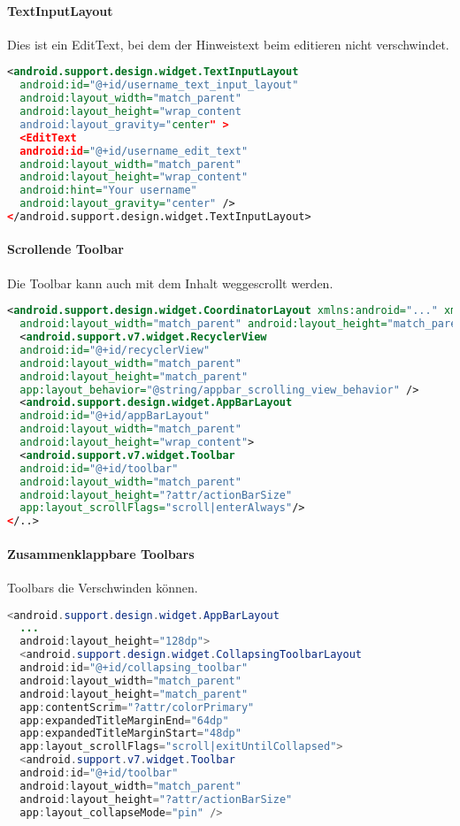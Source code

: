 \paragraph{TextInputLayout} Dies ist ein EditText, bei dem der Hinweistext beim editieren nicht verschwindet.
\begin{lstlisting}[language=xml]
<android.support.design.widget.TextInputLayout
  android:id="@+id/username_text_input_layout"
  android:layout_width="match_parent"
  android:layout_height="wrap_content
  android:layout_gravity="center" >
  <EditText
  android:id="@+id/username_edit_text"
  android:layout_width="match_parent"
  android:layout_height="wrap_content"
  android:hint="Your username"
  android:layout_gravity="center" />
</android.support.design.widget.TextInputLayout>
\end{lstlisting}
\paragraph{Scrollende Toolbar} Die Toolbar kann auch mit dem Inhalt weggescrollt werden. 
\begin{lstlisting}[language=xml]
<android.support.design.widget.CoordinatorLayout xmlns:android="..." xmlns:app="..."
  android:layout_width="match_parent" android:layout_height="match_parent">
  <android.support.v7.widget.RecyclerView
  android:id="@+id/recyclerView"
  android:layout_width="match_parent"
  android:layout_height="match_parent"
  app:layout_behavior="@string/appbar_scrolling_view_behavior" />
  <android.support.design.widget.AppBarLayout
  android:id="@+id/appBarLayout"
  android:layout_width="match_parent"
  android:layout_height="wrap_content">
  <android.support.v7.widget.Toolbar
  android:id="@+id/toolbar"
  android:layout_width="match_parent"
  android:layout_height="?attr/actionBarSize"
  app:layout_scrollFlags="scroll|enterAlways"/>
</..>
\end{lstlisting}
\paragraph{Zusammenklappbare Toolbars} Toolbars die Verschwinden können.
\begin{lstlisting}[language=java]
<android.support.design.widget.AppBarLayout
  ...
  android:layout_height="128dp">
  <android.support.design.widget.CollapsingToolbarLayout
  android:id="@+id/collapsing_toolbar"
  android:layout_width="match_parent"
  android:layout_height="match_parent"
  app:contentScrim="?attr/colorPrimary"
  app:expandedTitleMarginEnd="64dp"
  app:expandedTitleMarginStart="48dp"
  app:layout_scrollFlags="scroll|exitUntilCollapsed">
  <android.support.v7.widget.Toolbar
  android:id="@+id/toolbar"
  android:layout_width="match_parent"
  android:layout_height="?attr/actionBarSize"
  app:layout_collapseMode="pin" />
\end{lstlisting}
